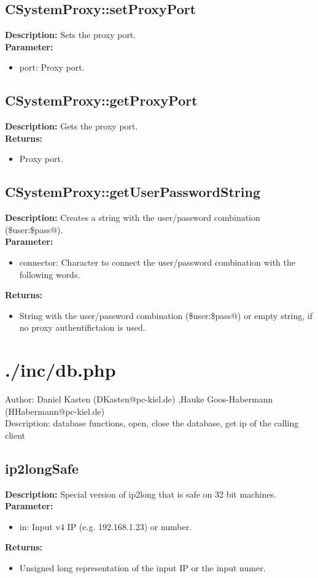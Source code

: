\subsection{CSystemProxy::setProxyPort}
\textbf{Description:} Sets the proxy port.\\
\textbf{Parameter:}
\begin{itemize}
\item port: Proxy port.
\end{itemize}

\subsection{CSystemProxy::getProxyPort}
\textbf{Description:} Gets the proxy port.\\
\textbf{Returns:}
\begin{itemize}
\item Proxy port.
\end{itemize}

\subsection{CSystemProxy::getUserPasswordString}
\textbf{Description:} Creates a string with the user/password combination (\$user:\$pass@).\\
\textbf{Parameter:}
\begin{itemize}
\item connector: Character to connect the user/password combination with the following words.
\end{itemize}
\textbf{Returns:}
\begin{itemize}
\item String with the user/password combination (\$user:\$pass@) or empty string, if no proxy authentifictaion is used.
\end{itemize}

\newpage\section{./inc/db.php}
 Author: Daniel Kasten (DKasten@pc-kiel.de) ,Hauke Goos-Habermann (HHabermann@pc-kiel.de)\\
 Description: database functions, open, close the database, get ip of the calling client\\

\subsection{ip2longSafe}
\textbf{Description:} Special version of ip2long that is safe on 32 bit machines.\\
\textbf{Parameter:}
\begin{itemize}
\item in: Input v4 IP (e.g. 192.168.1.23) or number.
\end{itemize}
\textbf{Returns:}
\begin{itemize}
\item Unsigned long representation of the input IP or the input numer.
\end{itemize}

